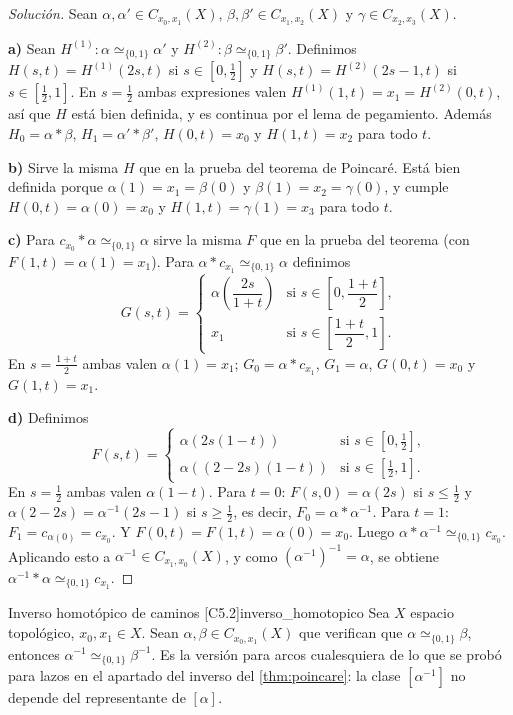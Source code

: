 \begin{proof}[Solución]
Sean $\alpha, \alpha' \in C_{x_0,x_1}(X)$, $\beta, \beta' \in C_{x_1,x_2}(X)$ y $\gamma \in C_{x_2,x_3}(X)$.

\textbf{a)} Sean $H^{(1)} \colon \alpha \simeq_{\{0,1\}} \alpha'$ y $H^{(2)} \colon \beta \simeq_{\{0,1\}} \beta'$. Definimos $H(s,t) = H^{(1)}(2s,t)$ si $s \in [0,\frac12]$ y $H(s,t) = H^{(2)}(2s-1,t)$ si $s \in [\frac12,1]$. En $s = \frac12$ ambas expresiones valen $H^{(1)}(1,t) = x_1 = H^{(2)}(0,t)$, así que $H$ está bien definida, y es continua por el lema de pegamiento. Además $H_0 = \alpha * \beta$, $H_1 = \alpha' * \beta'$, $H(0,t) = x_0$ y $H(1,t) = x_2$ para todo $t$.

\textbf{b)} Sirve la misma $H$ que en la prueba del teorema de Poincaré. Está bien definida porque $\alpha(1) = x_1 = \beta(0)$ y $\beta(1) = x_2 = \gamma(0)$, y cumple $H(0,t) = \alpha(0) = x_0$ y $H(1,t) = \gamma(1) = x_3$ para todo $t$.

\textbf{c)} Para $c_{x_0} * \alpha \simeq_{\{0,1\}} \alpha$ sirve la misma $F$ que en la prueba del teorema (con $F(1,t) = \alpha(1) = x_1$). Para $\alpha * c_{x_1} \simeq_{\{0,1\}} \alpha$ definimos
\[ G(s,t) = \begin{cases} \alpha\left( \dfrac{2s}{1+t} \right) & \text{si } s \in \left[0, \dfrac{1+t}{2}\right], \\[2ex] x_1 & \text{si } s \in \left[\dfrac{1+t}{2}, 1\right]. \end{cases} \]
En $s = \frac{1+t}{2}$ ambas valen $\alpha(1) = x_1$; $G_0 = \alpha * c_{x_1}$, $G_1 = \alpha$, $G(0,t) = x_0$ y $G(1,t) = x_1$.

\textbf{d)} Definimos
\[ F(s,t) = \begin{cases} \alpha(2s(1-t)) & \text{si } s \in [0,\frac12], \\ \alpha((2-2s)(1-t)) & \text{si } s \in [\frac12,1]. \end{cases} \]
En $s = \frac12$ ambas valen $\alpha(1-t)$. Para $t = 0$: $F(s,0) = \alpha(2s)$ si $s \le \frac12$ y $\alpha(2-2s) = \alpha^{-1}(2s-1)$ si $s \ge \frac12$, es decir, $F_0 = \alpha * \alpha^{-1}$. Para $t = 1$: $F_1 = c_{\alpha(0)} = c_{x_0}$. Y $F(0,t) = F(1,t) = \alpha(0) = x_0$. Luego $\alpha * \alpha^{-1} \simeq_{\{0,1\}} c_{x_0}$. Aplicando esto a $\alpha^{-1} \in C_{x_1,x_0}(X)$, y como $(\alpha^{-1})^{-1} = \alpha$, se obtiene $\alpha^{-1} * \alpha \simeq_{\{0,1\}} c_{x_1}$.
\end{proof}

\begin{proposicion}{Inverso homotópico de caminos [C5.2]}{inverso_homotopico}
Sea $X$ espacio topológico, $x_0, x_1 \in X$. Sean $\alpha, \beta \in C_{x_0, x_1}(X)$ que verifican que $\alpha \simeq_{\{0,1\}} \beta$, entonces $\alpha^{-1} \simeq_{\{0,1\}} \beta^{-1}$. Es la versión para arcos cualesquiera de lo que se probó para lazos en el apartado del inverso del \cref{thm:poincare}: la clase $[\alpha^{-1}]$ no depende del representante de $[\alpha]$.
\end{proposicion}

